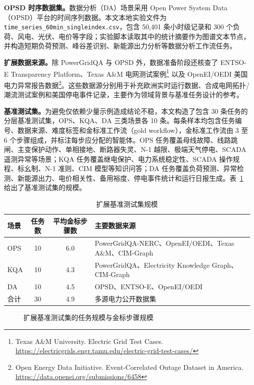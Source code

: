 \textbf{OPSD 时序数据集。}数据分析（DA）场景采用 Open Power System Data（OPSD）平台的时间序列数据\cite{wiese2019opsd}。本文本地实验文件为 \texttt{time\_series\_60min\_singleindex.csv}，包含 50{,}401 条小时级记录和 300 个负荷、风电、光伏、电价等字段；实验脚本读取其中的统计摘要作为图谱文本节点，并构造短期负荷预测、峰谷差识别、新能源出力分析等数据分析工作流任务。

\textbf{扩展数据来源。}除 PowerGridQA 与 OPSD 外，数据准备阶段还核查了 ENTSO-E Transparency Platform\cite{hirth2018entsoe}、Texas A\&M 电网测试案例\footnote{Texas A\&M University. Electric Grid Test Cases. \url{https://electricgrids.engr.tamu.edu/electric-grid-test-cases/}}\cite{birchfield2017synthetic} 以及 OpenEI/OEDI 美国电力异常报告数据\footnote{Open Energy Data Initiative. Event-Correlated Outage Dataset in America. \url{https://data.openei.org/submissions/6458}}。这些数据源分别用于补充欧洲实时运行数据、合成电网拓扑/潮流测试案例和美国停电事件记录，主要作为领域背景与基准任务设计的参考。

\textbf{基准测试集。}为避免仅依赖少量示例造成结论不稳，本文构造了包含 30 条任务的分层基准测试集，OPS、KQA、DA 三类场景各 10 条。每条样本均包含任务编号、数据来源、难度标签和金标准工作流（gold workflow），金标准工作流由 3 至 6 个步骤组成，并标注每步应分配的智能体。OPS 任务覆盖母线故障、线路跳闸、主变保护动作、单相接地、断路器失灵、N-1 越限、极端天气停电、SCADA 遥测异常等场景；KQA 任务覆盖继电保护、电力系统稳定性、SCADA 操作规程、标幺制、N-1 准则、CIM 模型等知识问答；DA 任务覆盖负荷预测、异常检测、新能源出力、电价相关性、备用裕度、停电事件统计和运行日报生成。表~\ref{tab:benchmark_scale} 给出了基准测试集的规模。

\begin{table}[htbp]
\centering
\caption{扩展基准测试集规模}
\label{tab:benchmark_scale}
\small
\begin{tabular}{@{}lccp{7.2cm}@{}}
\toprule
场景 & 任务数 & 平均金标步骤数 & 主要数据来源 \\
\midrule
OPS & 10 & 6.0 & PowerGridQA-NERC、OpenEI/OEDI、Texas A\&M、CIM-Graph \\
KQA & 10 & 4.3 & PowerGridQA、Electricity Knowledge Graph、CIM-Graph \\
DA  & 10 & 4.5 & OPSD、ENTSO-E、OpenEI/OEDI \\
\midrule
合计 & 30 & 4.9 & 多源电力公开数据集 \\
\bottomrule
\end{tabular}
\end{table}

\begin{figure}[htbp]
\centering

\caption{扩展基准测试集的任务规模与金标步骤规模}
\label{fig:benchmark_profile}
\end{figure}


